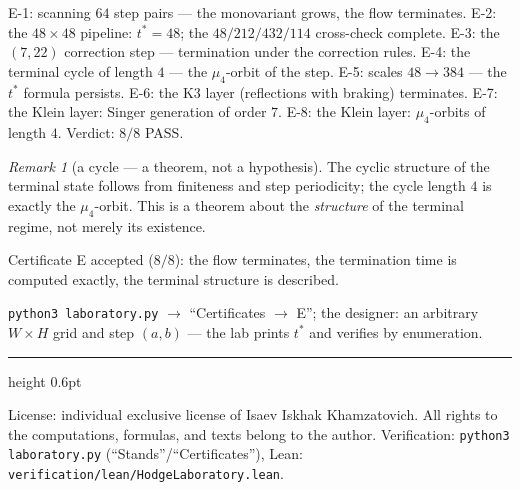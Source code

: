 \documentclass[11pt,a4paper]{article}
\theoremstyle{plain}
\theoremstyle{definition}
\theoremstyle{remark}
\newtheorem{remark}[theorem]{Remark}
\begin{document}
\begin{databox}
E-1: scanning $64$ step pairs --- the monovariant grows, the flow
terminates. E-2: the $48\times48$ pipeline: $t^*=48$; the
$48/212/432/114$ cross-check complete. E-3: the $(7,22)$ correction
step --- termination under the correction rules. E-4: the terminal
cycle of length $4$ --- the $\mu_4$-orbit of the step. E-5: scales
$48\to384$ --- the $t^*$ formula persists. E-6: the K3 layer
(reflections with braking) terminates. E-7: the Klein layer:
Singer generation of order $7$. E-8: the Klein layer:
$\mu_4$-orbits of length $4$. Verdict: $8/8$ PASS.
\end{databox}

\begin{remark}[a cycle --- a theorem, not a hypothesis]
The cyclic structure of the terminal state follows from finiteness
and step periodicity; the cycle length $4$ is exactly the
$\mu_4$-orbit. This is a theorem about the \emph{structure} of the
terminal regime, not merely its existence.
\end{remark}

\begin{statusbox}[summary]
Certificate E accepted ($8/8$): the flow terminates, the
termination time is computed exactly, the terminal structure is
described.
\end{statusbox}

\begin{verifybox}[reproduction]
\texttt{python3 laboratory.py} $\to$ ``Certificates $\to$ E''; the
designer: an arbitrary $W\times H$ grid and step $(a,b)$ --- the
lab prints $t^*$ and verifies by enumeration.
\end{verifybox}

\vfill
{\color{linkblue}\hrule height 0.6pt}
\vspace{0.5em}
{\small\color{gray}
License: individual exclusive license of Isaev Iskhak Khamzatovich.
All rights to the computations, formulas, and texts belong to the author.
Verification: \texttt{python3 laboratory.py} (``Stands''/``Certificates''),
Lean: \texttt{verification/lean/HodgeLaboratory.lean}.
}
\end{document}
